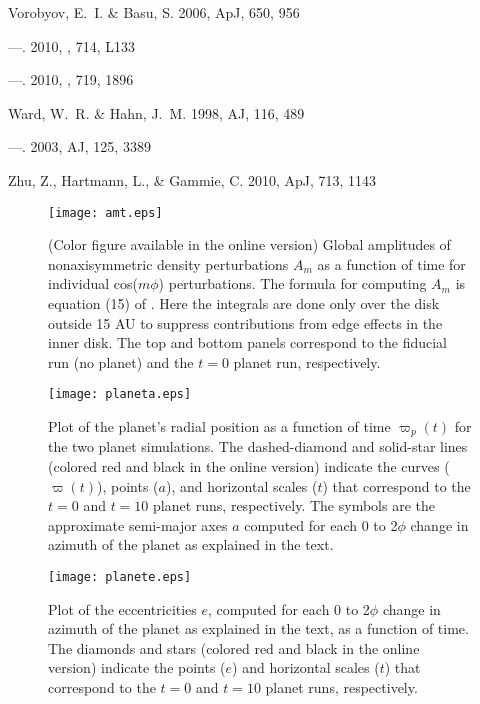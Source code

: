 \documentclass[12pt,manuscript,authoryear]{aastex}
\begin{document}
\begin{thebibliography}{48}
{Vorobyov}, E.~I. \& {Basu}, S. 2006, ApJ, 650, 956

---. 2010{}, \apjl, 714, L133

---. 2010{}, \apj, 719, 1896

{Ward}, W.~R. \& {Hahn}, J.~M. 1998, AJ, 116, 489

---. 2003, AJ, 125, 3389

{Zhu}, Z., {Hartmann}, L., \& {Gammie}, C. 2010, ApJ, 713, 1143

\end{thebibliography}

\newpage

\begin{figure}[t]
\center
\texttt{[image: amt.eps]}
\caption{(Color figure available in the online version) Global amplitudes of nonaxisymmetric density perturbations $A_m$ as a function of time for individual cos($m\phi$) perturbations. The formula for computing $A_m$ is equation (15) of \citep{boley2006}. Here the integrals are done only over the disk outside 15 AU to suppress contributions from edge effects in the inner disk. The top and bottom panels correspond to the fiducial run (no planet) and the $t = 0$ planet run, respectively.}
\label{fig:Am}
\end{figure}

\begin{figure}[t]
\center
\texttt{[image: planeta.eps]}
\caption{Plot of the planet's radial position as a function of time $\varpi_p(t)$ for the two planet simulations. The dashed-diamond and solid-star lines (colored red and black in the online version) indicate the curves ($\varpi(t)$), points ($a$), and horizontal scales ($t$) that correspond to the $t = 0$ and $t = 10$ planet runs, respectively. The symbols are the approximate semi-major axes $a$ computed for each 0 to 2$\phi$ change in azimuth of the planet as explained in the text.}
\label{fig:a}
\end{figure}

\begin{figure}[t]
\center
\texttt{[image: planete.eps]}
\caption{Plot of the eccentricities $e$, computed for each 0 to 2$\phi$ change in azimuth of the planet as explained in the text, as a function of time. The diamonds and stars (colored red and black in the online version) indicate the points ($e$) and horizontal scales ($t$) that correspond to the $t = 0$ and $t = 10$ planet runs, respectively.}
\label{fig:e}
\end{figure}


\label{lastpage}
\end{document}
